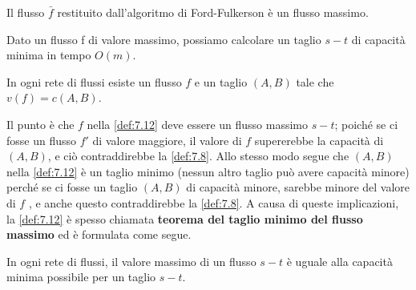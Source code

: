 \begin{myblockquote}
  \begin{minipage}{\textwidth}
    \begin{definition}\label{def:7.10}
      Il flusso $\bar{f}$ restituito dall'algoritmo di Ford-Fulkerson è un
      flusso massimo.
    \end{definition}
  \end{minipage}
\end{myblockquote}
\begin{myblockquote}
  \begin{minipage}{\textwidth}
    \begin{definition}\label{def:7.11}
      Dato un flusso f di valore massimo, possiamo calcolare un taglio $s-t$
      di capacità minima in tempo $O(m)$.
    \end{definition}
  \end{minipage}
\end{myblockquote}
\begin{myblockquote}
  \begin{minipage}{\textwidth}
    \begin{definition}\label{def:7.12}
      In ogni rete di flussi esiste un flusso $f$ e un taglio $(A, B)$
      tale che $v(f) = c(A, B)$.
    \end{definition}
  \end{minipage}
\end{myblockquote}

Il punto è che $f$ nella \ref{def:7.12} deve essere un flusso massimo $s-t$;
poiché se ci fosse un flusso $f'$ di valore maggiore, il valore di
$f$ supererebbe la capacità di $(A, B)$, e ciò contraddirebbe la
\ref{def:7.8}. Allo stesso modo segue che $(A, B)$ nella \ref{def:7.12} è un taglio
minimo (nessun altro taglio può avere capacità minore) perché se ci
fosse un taglio $(A , B)$ di capacità minore, sarebbe minore del
valore di $f$ , e anche questo contraddirebbe la \ref{def:7.8}. A causa di
queste implicazioni, la \ref{def:7.12} è spesso chiamata \textbf{teorema del
  taglio minimo del flusso massimo} ed è formulata come segue.

\begin{myblockquote}
  \begin{minipage}{\textwidth}
    \begin{theorem}
      In ogni rete di flussi, il valore massimo di un flusso $s-t$ è
      uguale alla capacità minima possibile per un taglio $s-t$.
    \end{theorem}
  \end{minipage}
\end{myblockquote}